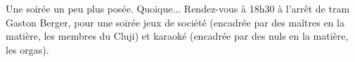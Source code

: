 Une soirée un peu plus posée. Quoique... Rendez-vous à 18h30 à l'arrêt de tram Gaston Berger, pour une soirée jeux de société (encadrée par des maîtres
en la matière, les membres du Cluji) et karaoké (encadrée
par des nuls en la matière, les orgas).
